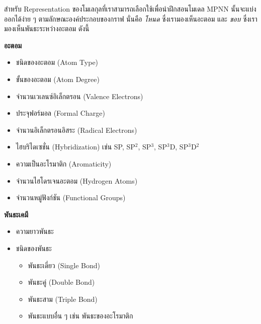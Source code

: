 สำหรับ Representation ของโมเลกุลที่เราสามารถเลือกใช้เพื่อนำฝึกสอนโมเดล MPNN นั้นจะแบ่งออกได้ง่าย ๆ ตามลักษณะองค์ประกอบของกราฟ นั่นคือ \textit{โหนด} ซึ่งเรามองเห็นอะตอม และ \textit{ขอบ} ซึ่งเรามองเห็นพันธะระหว่างอะตอม ดังนี้

\noindent \textbf{อะตอม}
%
\begin{itemize}[topsep=0pt,noitemsep]\setlength\itemsep{0.5em}
    \item ชนิดของอะตอม (Atom Type)

    \item ขั้นของอะตอม (Atom Degree)

    \item จำนวนเวเลนซ์อิเล็กตรอน (Valence Electrons)

    \item ประจุฟอร์มอล (Formal Charge)

    \item จำนวนอิเล็กตรอนอิสระ (Radical Electrons)

    \item ไฮบริไดเซชั่น (Hybridization) เช่น SP, SP$^2$, SP$^3$, SP$^3$D, SP$^3$D$^2$

    \item ความเป็นอะโรมาติก (Aromaticity)

    \item จำนวนไฮโดรเจนอะตอม (Hydrogen Atoms)

    \item จำนวนหมู่ฟังก์ชัน (Functional Groups)
\end{itemize}

\medskip

\noindent \textbf{พันธะเคมี}
%
\begin{itemize}[topsep=0pt,noitemsep]\setlength\itemsep{0.5em}
    \item ความยาวพันธะ

    \item ชนิดของพันธะ
          \begin{itemize}[topsep=0pt,noitemsep]\setlength\itemsep{0.5em}
              \item พันธะเดี่ยว (Single Bond)

              \item พันธะคู่ (Double Bond)

              \item พันธะสาม (Triple Bond)

              \item พันธะแบบอื่น ๆ เช่น พันธะของอะโรมาติก
          \end{itemize}
\end{itemize}

